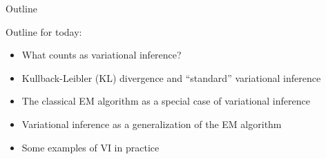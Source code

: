 
\begin{frame}{Outline}

Outline for today:

\begin{itemize}
    \item What counts as variational inference?
    \item Kullback-Leibler (KL) divergence and ``standard'' variational inference
    \item The classical EM algorithm as a special case of variational inference
    \item Variational inference as a generalization of the EM algorithm
    \item Some examples of VI in practice
\end{itemize}

\end{frame}

